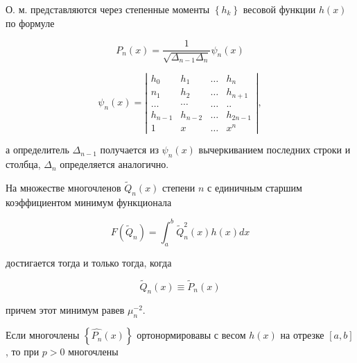 \documentclass[10pt]{article}
\begin{document}
О. м. представляются через степенные моменты $\left\{h_{k}\right\}$ весовой функции $h(x)$ по формуле



\[

P_{n}(x)=\frac{1}{\sqrt{\Delta_{n-1} \Delta_{n}}} \psi_{n}(x)

\]



\[

\psi_{n}(x)=\left|\begin{array}{llll}

h_{0} & h_{1} & \ldots & h_{n} \\

n_{1} & h_{2} & \ldots & h_{n+1} \\

\ldots & \cdots & \ldots & . . \\

h_{n-1} & h_{n-2} & \ldots & h_{2 n-1} \\

1 & x & \ldots & x^{n}

\end{array}\right|,

\]



а определитель $\Delta_{n-1}$ получается из $\psi_{n}(x)$ вычеркиванием последних строки и столбца, $\Delta_{n}$ определяется аналогично.



На множестве многочленов $\tilde{Q}_{n}(x)$ степени $n$ с единичным старшим коэффициентом минимум функционала



\[

F\left(\tilde{Q}_{n}\right)=\int_{a}^{b} \tilde{Q}_{n}^{2}(x) h(x) d x

\]



достигается тогда и только тогда, когда



\[

\tilde{Q}_{n}(x) \equiv \tilde{P}_{n}(x)

\]



причем этот минимум равев $\mu_{n}^{-2}$.



Если многочлены $\left\{\hat{P_{n}}(x)\right\}$ ортонормировавы с весом $h(x)$ на отрезке $[a, b]$, то при $p>0$ многочлены
\end{document}
